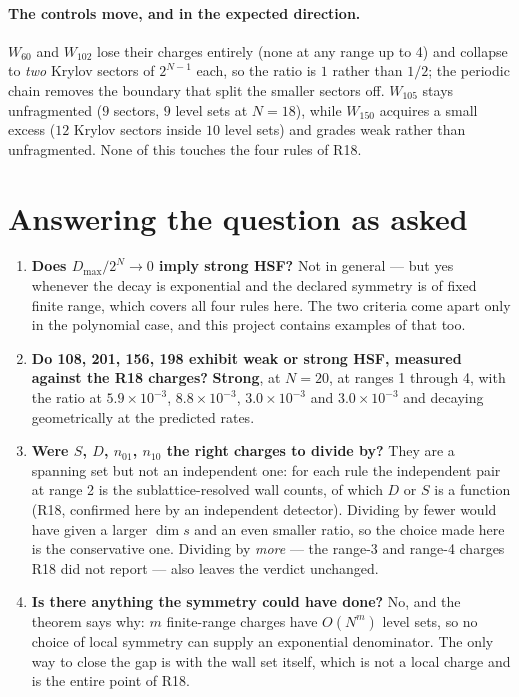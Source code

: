 \documentclass[11pt]{article}
\theoremstyle{plain}
\begin{document}
\paragraph{The controls move, and in the expected direction.}
$W_{60}$ and $W_{102}$ lose their charges entirely (none at any range up to 4)
and collapse to \emph{two} Krylov sectors of $2^{N-1}$ each, so the ratio is
$1$ rather than $1/2$; the periodic chain removes the boundary that split the
smaller sectors off. $W_{105}$ stays unfragmented ($9$ sectors, $9$ level sets
at $N=18$), while $W_{150}$ acquires a small excess ($12$ Krylov sectors inside
$10$ level sets) and grades weak rather than unfragmented. None of this touches
the four rules of R18.

\section{Answering the question as asked}

\begin{enumerate}
\item \textbf{Does $D_{\max}/2^N\to0$ imply strong HSF?} Not in general --- but
yes whenever the decay is exponential and the declared symmetry is of fixed
finite range, which covers all four rules here. The two criteria come apart
only in the polynomial case, and this project contains examples of that too.

\item \textbf{Do 108, 201, 156, 198 exhibit weak or strong HSF, measured against
the R18 charges?} \textbf{Strong}, at $N=20$, at ranges 1 through 4, with the
ratio at $5.9\times10^{-3}$, $8.8\times10^{-3}$, $3.0\times10^{-3}$ and
$3.0\times10^{-3}$ and decaying geometrically at the predicted rates.

\item \textbf{Were $S$, $D$, $n_{01}$, $n_{10}$ the right charges to divide
by?} They are a spanning set but not an independent one: for each rule the
independent pair at range 2 is the sublattice-resolved wall counts, of which
$D$ or $S$ is a function (R18, confirmed here by an independent detector).
Dividing by fewer would have given a larger $\dim s$ and an even smaller ratio,
so the choice made here is the conservative one. Dividing by \emph{more} --- the
range-3 and range-4 charges R18 did not report --- also leaves the verdict
unchanged.

\item \textbf{Is there anything the symmetry could have done?} No, and the
theorem says why: $m$ finite-range charges have $O(N^m)$ level sets, so no
choice of local symmetry can supply an exponential denominator. The only way to
close the gap is with the wall set itself, which is not a local charge and is
the entire point of R18.
\end{enumerate}
\end{document}
